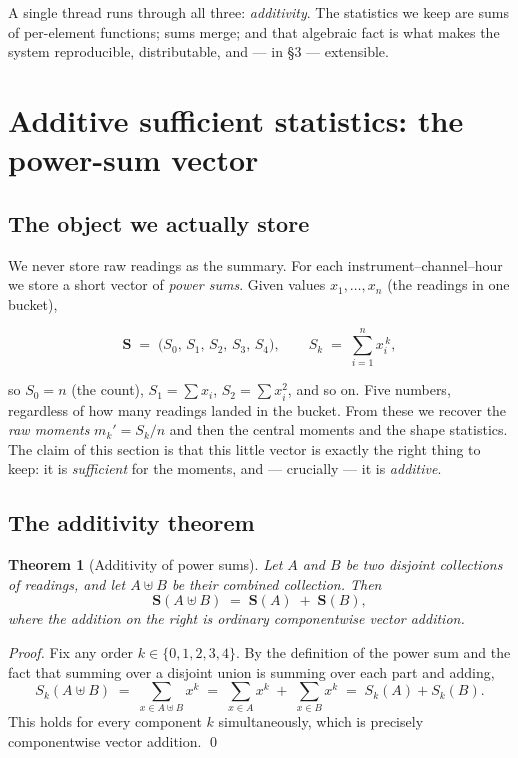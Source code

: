 \documentclass[11pt]{article}
\newtheorem{theorem}{Theorem}
\theoremstyle{definition}
\newcommand{\powsum}{\mathbf{S}}
\begin{document}
A single thread runs through all three: \emph{additivity}. The statistics we keep are sums of
per-element functions; sums merge; and that algebraic fact is what makes the system reproducible,
distributable, and --- in \S3 --- extensible.

\section{Additive sufficient statistics: the power-sum vector}

\subsection{The object we actually store}

We never store raw readings as the summary. For each instrument--channel--hour we store a short
vector of \emph{power sums}. Given values $x_1, \dots, x_n$ (the readings in one bucket),

\begin{equation}
  \powsum \;=\; \bigl(S_0,\, S_1,\, S_2,\, S_3,\, S_4\bigr),
  \qquad
  S_k \;=\; \sum_{i=1}^{n} x_i^{\,k},
\end{equation}

so $S_0 = n$ (the count), $S_1 = \sum x_i$, $S_2 = \sum x_i^2$, and so on. Five numbers, regardless
of how many readings landed in the bucket. From these we recover the \emph{raw moments}
$m_k' = S_k / n$ and then the central moments and the shape statistics. The claim of this section
is that this little vector is exactly the right thing to keep: it is \emph{sufficient} for the
moments, and --- crucially --- it is \emph{additive}.

\subsection{The additivity theorem}

\begin{theorem}[Additivity of power sums]\label{thm:add}
Let $A$ and $B$ be two disjoint collections of readings, and let $A \uplus B$ be their combined
collection. Then
\begin{equation}
  \powsum(A \uplus B) \;=\; \powsum(A) \;+\; \powsum(B),
\end{equation}
where the addition on the right is ordinary componentwise vector addition.
\end{theorem}

\begin{proof}
Fix any order $k \in \{0,1,2,3,4\}$. By the definition of the power sum and the fact that summing
over a disjoint union is summing over each part and adding,
\begin{equation}
  S_k(A \uplus B)
  \;=\; \sum_{x \in A \uplus B} x^{k}
  \;=\; \sum_{x \in A} x^{k} \;+\; \sum_{x \in B} x^{k}
  \;=\; S_k(A) + S_k(B).
\end{equation}
This holds for every component $k$ simultaneously, which is precisely componentwise vector
addition. \qed
\end{proof}
\end{document}
